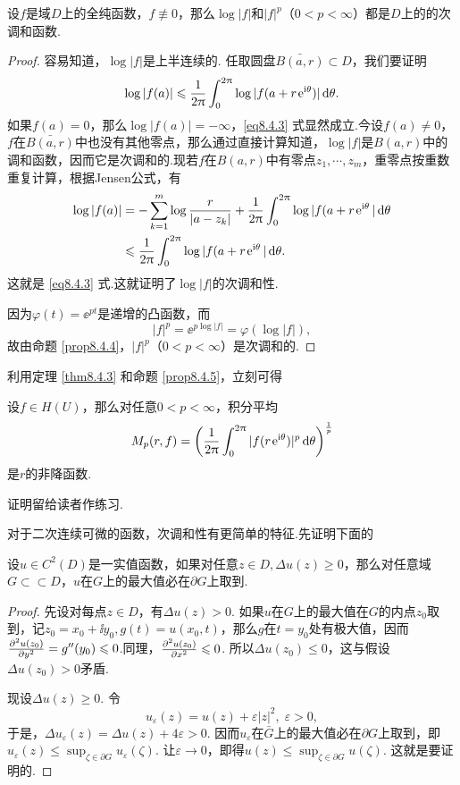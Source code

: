 \begin{prop}\label{prop8.4.5}
  设$f$是域$D$上的全纯函数，$f\not\equiv 0$，那么$\log|f|$和$|f|^p$（$0<p<\infty$）都是$D$上的的次调和函数.
\end{prop}
\begin{proof}
  容易知道，$\log|f|$是上半连续的. 任取圆盘$\bar{B(a,r)}\subset D$，我们要证明
  \begin{equation}\label{eq8.4.3}
    \log|f(a)| \leqslant \frac1{2\uppi}\int_0^{2\uppi}\log|f(a+r\operatorname{\!\!\;\mathrm e}^{\mathrm i\theta})|\mathop{}\!\mathrm{d} \theta.
  \end{equation}
  如果$f(a)=0$，那么$\log|f(a)|=-\infty$，\eqref{eq8.4.3} 式显然成立.今设$f(a)\ne0$，$f$在$\bar{B(a,r)}$中也没有其他零点，那么通过直接计算知道，$\log|f|$是$B(a,r)$中的调和函数，因而它是次调和的.现若$f$在$B(a,r)$中有零点$z_1,\cdots,z_m$，重零点按重数重复计算，根据Jensen公式，有
  \begin{align*}
    \log|f(a)| & = -\sum_{k=1}^m\log\frac r{|a-z_k|}+\frac1{2\uppi}\int_0^{2\uppi}\log|f(a+r\operatorname{\!\!\;\mathrm e}^{\mathrm i\theta}|\mathop{}\!\mathrm{d} \theta\\
    & \leqslant \frac1{2\uppi}\int_0^{2\uppi}\log|f(a+r\operatorname{\!\!\;\mathrm e}^{\mathrm i\theta}|\mathop{}\!\mathrm{d} \theta.
  \end{align*}
  这就是 \eqref{eq8.4.3} 式.这就证明了$\log|f|$的次调和性.

  因为$\varphi(t)=\ee^{pt}$是递增的凸函数，而
  \[
    |f|^p = \ee^{p\log|f|} = \varphi(\log|f|),
  \]
  故由命题 \ref{prop8.4.4}，$|f|^p$（$0<p<\infty$）是次调和的.
\end{proof}

利用定理 \ref{thm8.4.3} 和命题 \ref{prop8.4.5}，立刻可得
\begin{prop}\label{prop8.4.6}
  设$f\in H(U)$，那么对任意$0<p<\infty$，积分平均
  \[
    M_p(r,f) = \bigg(\frac1{2\uppi}\int_0^{2\uppi}|f(r\operatorname{\!\!\;\mathrm e}^{\mathrm i\theta})|^p\mathop{}\!\mathrm{d} \theta\bigg)^{\frac1p}
  \]
  是$r$的非降函数.
\end{prop}

证明留给读者作练习.

对于二次连续可微的函数，次调和性有更简单的特征.先证明下面的
\begin{prop}\label{prop8.4.7}
  设$u\in C^2(D)$是一实值函数，如果对任意$z\in D,\Delta u(z)\ge0$，那么对任意域$G\subset\subset D$，$u$在$G$上的最大值必在$\partial G$上取到.
\end{prop}
\begin{proof}
  先设对每点$z\in D$，有$\Delta u(z)>0$. 如果$u$在$G$上的最大值在$G$的内点$z_0$取到，记$z_0=x_0+\ii y_0,g(t)=u(x_0,t)$，那么$g$在$t=y_0$处有极大值，因而$\frac{\partial^2 u(z_0)}{\partial y^2}
  =g''(y_0)\leqslant0$.同理，$\frac{\partial^2 u(z_0)}{\partial x^2}\leqslant0$. 所以$\Delta u(z_0)\le0$，这与假设$\Delta u(z_0)>0$矛盾.

  现设$\Delta u(z)\ge0$. 令
  \[
    u_\varepsilon(z) = u(z) + \varepsilon|z|^2,\; \varepsilon > 0,
  \]
  于是，$\Delta u_\varepsilon(z)=\Delta u(z)+4\varepsilon>0$. 因而$u_\varepsilon$在$\bar G$上的最大值必在$\partial G$上取到，即$u_\varepsilon(z)\le\sup_{\zeta\in\partial G}u_\varepsilon(\zeta)$. 让$\varepsilon\to0$，即得$u(z)\le\sup_{\zeta\in\partial G}u(\zeta)$. 这就是要证明的.
\end{proof}

